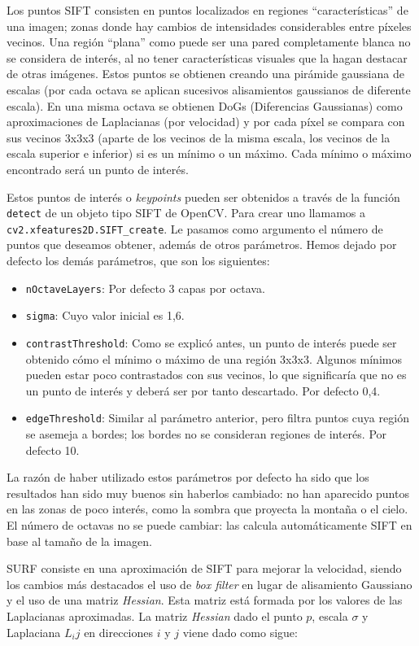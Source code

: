 \documentclass[12pt,spanish]{article} %
\begin{document}
Los puntos SIFT consisten en puntos localizados en regiones ``características'' de una imagen; zonas donde hay cambios de intensidades considerables entre píxeles vecinos. Una región ``plana'' como puede ser una pared completamente blanca no se considera de interés, al no tener características visuales que la hagan destacar de otras imágenes. Estos puntos se obtienen creando una pirámide gaussiana de escalas (por cada octava se aplican sucesivos alisamientos gaussianos de diferente escala). En una misma octava se obtienen DoGs (Diferencias Gaussianas) como aproximaciones de Laplacianas (por velocidad) y por cada píxel se compara con sus vecinos 3x3x3 (aparte de los vecinos de la misma escala, los vecinos de la escala superior e inferior) si es un mínimo o un máximo. Cada mínimo o máximo encontrado será un punto de interés.

Estos puntos de interés o \textit{keypoints} pueden ser obtenidos a través de la función \texttt{detect} de un objeto tipo SIFT de OpenCV. Para crear uno llamamos a \texttt{cv2.xfeatures2D.SIFT\_create}. Le pasamos como argumento el número de puntos que deseamos obtener, además de otros parámetros. Hemos dejado por defecto los demás parámetros, que son los siguientes:

\begin{itemize}
\item \texttt{nOctaveLayers}: Por defecto 3 capas por octava.
\item \texttt{sigma}: Cuyo valor inicial es 1,6.
\item \texttt{contrastThreshold}: Como se explicó antes, un punto de interés puede ser obtenido cómo el mínimo o máximo de una región 3x3x3. Algunos mínimos pueden estar poco contrastados con sus vecinos, lo que significaría que no es un punto de interés y deberá ser por tanto descartado. Por defecto 0,4.
\item \texttt{edgeThreshold}: Similar al parámetro anterior, pero filtra puntos cuya región se asemeja a bordes; los bordes no se consideran regiones de interés. Por defecto 10.
\end{itemize}

La razón de haber utilizado estos parámetros por defecto ha sido que los resultados han sido muy buenos sin haberlos cambiado: no han aparecido puntos en las zonas de poco interés, como la sombra que proyecta la montaña o el cielo. El número de octavas no se puede cambiar: las calcula automáticamente SIFT en base al tamaño de la imagen.

SURF consiste en una aproximación de SIFT para mejorar la velocidad, siendo los cambios más destacados el uso de \textit{box filter} en lugar de alisamiento Gaussiano y el uso de una matriz \textit{Hessian}. Esta matriz está formada por los valores de las Laplacianas aproximadas. La matriz \textit{Hessian} dado el punto $p$, escala $\sigma$ y Laplaciana $L_ij$ en direcciones $i$ y $j$ viene dado como sigue:
\end{document}
